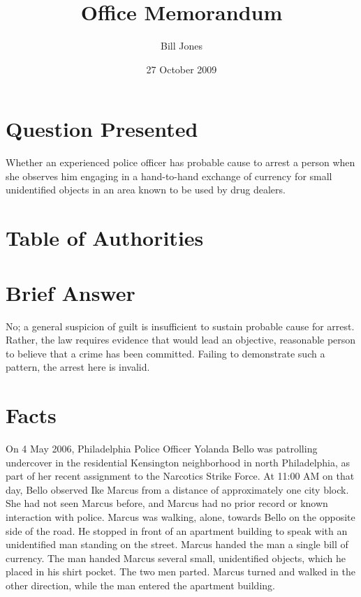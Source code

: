 \documentclass[12pt]{lawmemo}
\begin{document}
\title{Office Memorandum}
\author{Bill Jones}
\date{27 October 2009}
\subject{Pennsylvania v.\ Marcus}
\maketitle 
\thispagestyle{empty} 


\section{Question Presented} Whether an experienced police officer has probable cause
to arrest a person when she observes him engaging in a hand-to-hand exchange of
currency for small unidentified objects in an area known to be used by drug
dealers.


\section{Table of Authorities}

\section{Brief Answer} No; a general suspicion of guilt is insufficient to
sustain probable cause for arrest.  Rather, the law requires evidence that
would lead an objective, reasonable person to believe that a crime has been
committed. Failing to demonstrate such a pattern, the arrest here is invalid.

\section{Facts}  On 4 May 2006, Philadelphia Police Officer
Yolanda Bello was patrolling undercover in the residential Kensington
neighborhood in north Philadelphia, as part of her recent assignment to the
Narcotics Strike Force. At 11:00 AM on that day, Bello observed Ike Marcus from
a distance of approximately one city block.  She had not seen Marcus before,
and Marcus had no prior record or known interaction with police.  Marcus was
walking, alone, towards Bello on the opposite side of the road.  He stopped in
front of an apartment building to speak with an unidentified man standing on
the street.  Marcus handed the man a single bill of currency.  The man handed
Marcus several small, unidentified objects, which he placed in his shirt
pocket.  The two men parted. Marcus turned and walked in the other direction,
while the man entered the apartment building.
\end{document}
